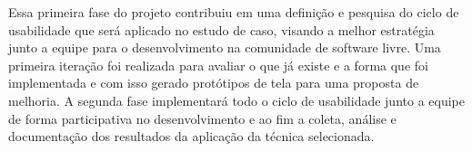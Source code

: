 Essa primeira fase do projeto contribuiu em uma definição e pesquisa do ciclo de usabilidade que será aplicado no estudo de caso, visando a melhor estratégia junto a equipe para o desenvolvimento na comunidade de software livre. Uma primeira iteração foi realizada para avaliar o que já existe e a forma que foi implementada e com isso gerado protótipos de tela para uma proposta de melhoria.  A segunda fase implementará todo o ciclo de usabilidade junto a equipe de forma participativa no desenvolvimento e ao fim a coleta, análise e documentação dos resultados da aplicação da técnica selecionada.